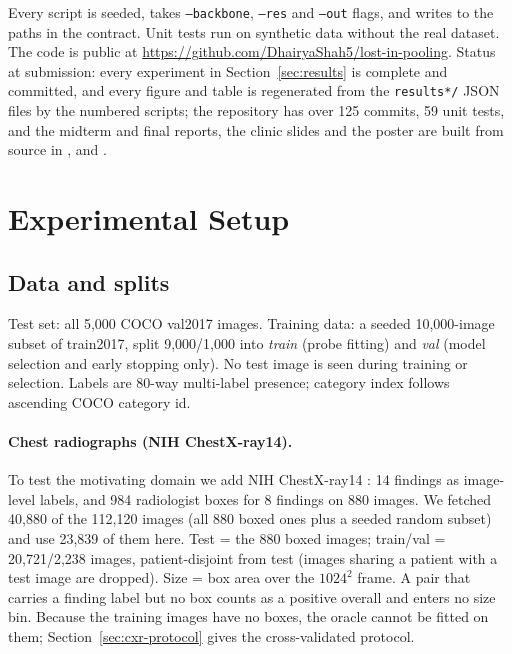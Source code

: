 \documentclass[10pt,letterpaper,twocolumn]{article}
\newcommand{\fname}[1]{\texttt{\detokenize{#1}}}
\begin{document}
Every script is seeded, takes \texttt{--backbone}, \texttt{--res} and \texttt{--out} flags, and
writes to the paths in the contract. Unit tests run on synthetic data without the real dataset. The code is public at
\url{https://github.com/DhairyaShah5/lost-in-pooling}.
Status at submission: every experiment in Section~\ref{sec:results} is complete and committed, and every figure and table is regenerated from the \texttt{results*/} JSON files by the numbered scripts; the repository has over 125 commits, 59 unit tests, and the midterm and final reports, the clinic slides and the poster are built from source in \fname{report/}, \fname{slides/} and \fname{poster/}.

\section{Experimental Setup}
\label{sec:setup}

\subsection{Data and splits}
Test set: all 5,000 COCO val2017 images. Training data: a seeded 10,000-image subset of
train2017, split 9,000/1,000 into \emph{train} (probe fitting) and \emph{val} (model selection
and early stopping only). No test image is seen during training or selection. Labels are
80-way multi-label presence; category index follows ascending COCO category id.

\paragraph{Chest radiographs (NIH ChestX-ray14).}
To test the motivating domain we add NIH ChestX-ray14 \citep{wang2017chestxray8}: 14 findings as
image-level labels, and 984 radiologist boxes for 8 findings on 880 images. We fetched 40,880
of the 112,120 images (all 880 boxed ones plus a seeded random subset) and use 23,839 of them
here. Test = the 880 boxed images; train/val = 20,721/2,238 images, patient-disjoint from test
(images sharing a patient with a test image are dropped). Size = box area over the $1024^2$
frame. A pair that carries a finding label but no box counts as a positive overall and enters
no size bin. Because the training images have no boxes, the oracle cannot be fitted on them;
Section~\ref{sec:cxr-protocol} gives the cross-validated protocol.
\end{document}
